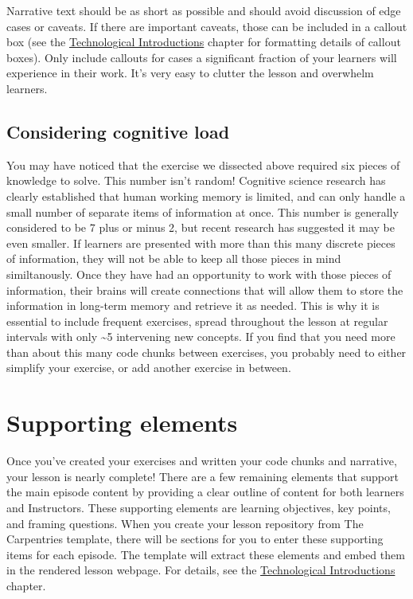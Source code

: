 \documentclass[]{book}
\begin{document}
Narrative text should be as short as possible and should avoid discussion of edge cases or caveats. If there
are important caveats, those can be included in a callout box (see the
\protect\hyperlink{technological-introductions}{Technological Introductions}
chapter for formatting details of callout boxes). Only include callouts for cases a significant fraction of your
learners will experience in their work. It's very easy to clutter the lesson and overwhelm learners.

\hypertarget{considering-cognitive-load}{%
\subsection{Considering cognitive load}\label{considering-cognitive-load}}

You may have noticed that the exercise we dissected above required six pieces of knowledge to solve.
This number isn't random! Cognitive science research has clearly established that human working memory is
limited, and can only handle a small number of separate items of information at once. This number is generally
considered to be 7 plus or minus 2, but recent research has suggested it may be even smaller. If learners are
presented with more than this many discrete pieces of information, they will not be able to keep all those
pieces in mind similtanously. Once they have had an opportunity to work with those pieces of information, their
brains will create connections that will allow them to store the information in long-term memory and retrieve it
as needed. This is why it is essential to include frequent exercises, spread throughout the lesson at regular
intervals with only \textasciitilde{}5 intervening new concepts. If you find that you need more than about this many code chunks
between exercises, you probably need to either simplify your exercise, or add another exercise in between.

\hypertarget{supporting-elements}{%
\section{Supporting elements}\label{supporting-elements}}

Once you've created your exercises and written your code chunks and narrative, your lesson is nearly complete!
There are a few remaining elements that support the main episode content by providing a clear outline
of content for both learners and Instructors. These supporting elements are learning objectives, key points, and
framing questions. When you create your lesson repository from The Carpentries template, there will be sections
for you to enter these supporting items for each episode. The template will extract these elements and embed
them in the rendered lesson webpage. For details, see the
\protect\hyperlink{technological-introductions}{Technological Introductions} chapter.
\end{document}
